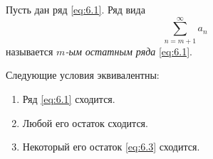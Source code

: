 

\begin{definition}
    Пусть дан ряд \ref{eq:6.1}. Ряд вида
    \begin{equation}\label{eq:6.3}
        \sum_{n=m+1}^{\infty}a_n
    \end{equation}
    называется \emph{$ m $-ым остатным ряда} \ref{eq:6.1}.
\end{definition}

\begin{theorem}
    Следующие условия эквивалентны:
    \begin{enumerate}
        \item Ряд \ref{eq:6.1} сходится.
        \item Любой его остаток сходится.
        \item Некоторый его остаток \ref{eq:6.3} сходится.
    \end{enumerate}
\end{theorem}

